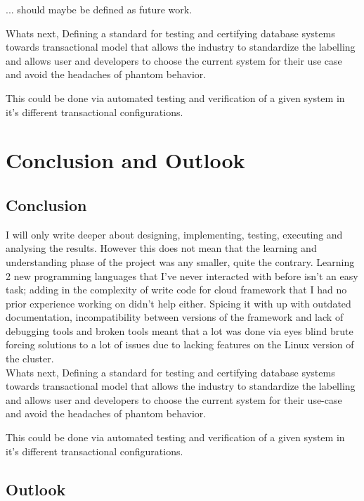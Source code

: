 \documentclass[a4paper,10pt,titlepage]{report}
\begin{document}
... should maybe be defined as future work.

Whats next, Defining a standard for testing and certifying database systems towards transactional model that allows the industry to standardize the labelling and allows user and developers to choose the current system for their use case and avoid the headaches of phantom behavior.

This could be done via automated testing and verification of a given system in it's different transactional configurations.


\chapter{Conclusion and Outlook}
\section*{Conclusion}

 I will only write deeper about designing, implementing, testing, executing and analysing the results. However this does not mean that the learning and understanding phase of the project was any smaller, quite the contrary. Learning 2 new programming languages that I've never interacted with before isn't an easy task; adding in the complexity of write code for cloud framework that I had no prior experience working on didn't help either. Spicing it with up with outdated documentation, incompatibility between versions of the framework and lack of debugging tools and broken tools meant that a lot was done via eyes blind brute forcing solutions to a lot of issues due to lacking features on the Linux version of the cluster.\\
 
 
Whats next, Defining a standard for testing and certifying database systems towards transactional model that allows the industry to standardize the labelling and allows user and developers to choose the current system for their use-case and avoid the headaches of phantom behavior.

This could be done via automated testing and verification of a given system in it's different transactional configurations.

\section*{Outlook}
\end{document}
